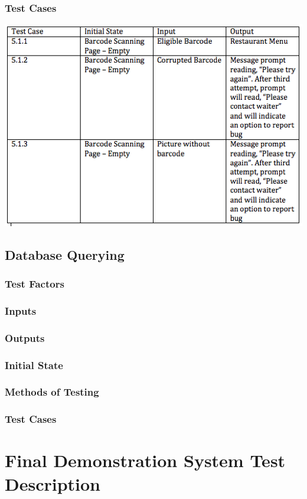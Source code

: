 \documentclass[12pt]{article}
\begin{document}
\subsubsection{Test Cases}
\includegraphics{Barcode.png}

\subsection{Database Querying}

\subsubsection{Test Factors}
\subsubsection{Inputs}
\subsubsection{Outputs}
\subsubsection{Initial State}
\subsubsection{Methods of Testing}
\subsubsection{Test Cases}

\section{Final Demonstration System Test Description}
\end{document}
